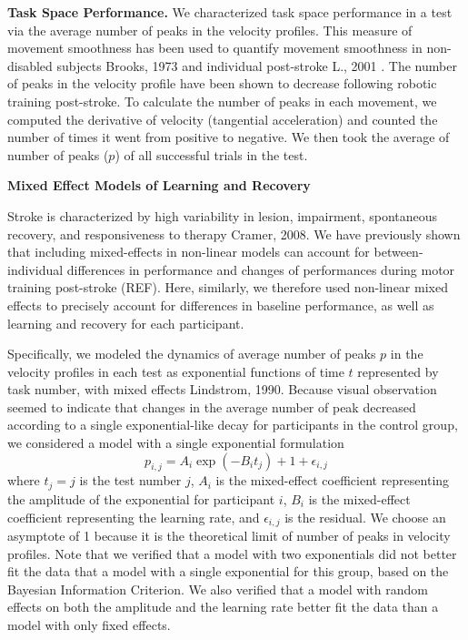 \textbf{Task Space Performance.}
We characterized task space performance in a test via the average number of peaks in the velocity profiles. 
This measure of movement smoothness has been used to quantify movement smoothness in non-disabled subjects {Brooks, 1973} and individual post-stroke {L., 2001 }. 
The number of peaks in the velocity profile have been shown to decrease following robotic training post-stroke.  
To calculate the number of peaks in each movement, we computed the derivative of velocity (tangential acceleration) and counted the number of times it went from positive to negative. 
We then took the average of number of peaks ($ p $) of all successful trials in the test. 

\textbf{Mixed Effect Models of Learning and Recovery}

Stroke is characterized by high variability in lesion, impairment, spontaneous recovery, and responsiveness to therapy {Cramer, 2008}. 
We have previously shown that including mixed-effects in non-linear models can account for between-individual differences in performance and changes of performances during motor training post-stroke (REF). 
Here, similarly, we therefore used non-linear mixed effects to precisely account for differences in baseline performance, as well as learning and recovery for each participant. 

Specifically, we modeled the dynamics of average number of peaks $ p $ in the velocity profiles in each test as exponential functions of time $ t $ represented by task number, with mixed effects {Lindstrom, 1990}. 
Because visual observation seemed to indicate that changes in the average number of peak decreased according to a single exponential-like decay for participants in the control group, we considered a model with a single exponential formulation
\begin{equation}\label{eqn:singleexp}
p_{i,j} = A_i \exp(-B_i t_{j}) + 1 + \epsilon_{i,j}
\end{equation}
where $ t_{j} = j $ is the test number $ j $, 
$ A_i $ is the mixed-effect coefficient representing the amplitude of the exponential for participant $ i $,
$ B_i $ is the mixed-effect coefficient representing the learning rate,
and $ \epsilon_{i,j} $ is the residual. 
We choose an asymptote of 1 because it is the theoretical limit of number of peaks in velocity profiles.
Note that we verified that a model with two exponentials did not better fit the data that a model with a single exponential for this group, based on the Bayesian Information Criterion. 
We also verified that a model with random effects on both the amplitude and the learning rate better fit the data than a model with only fixed effects. 

